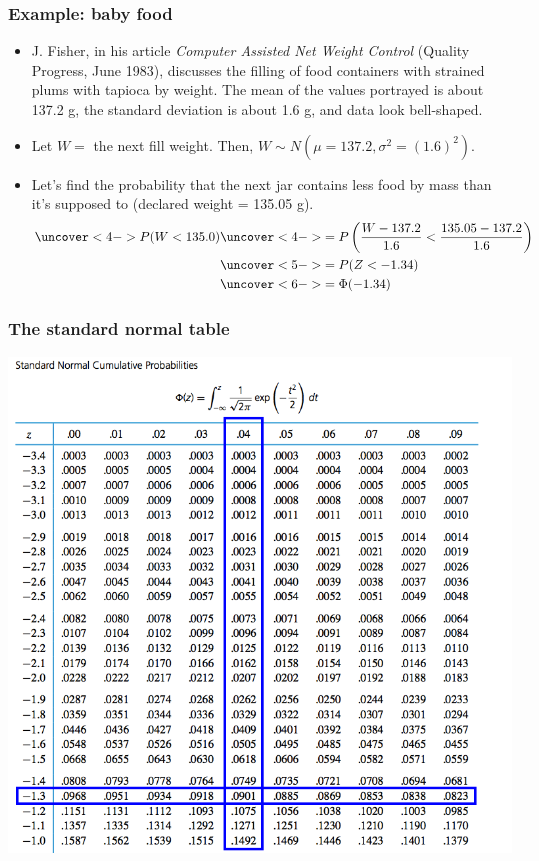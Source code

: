 \documentclass[handout]{beamer}\usepackage[]{graphicx}\usepackage[]{color}
\numberwithin{equation}{section}
\begin{document}
\begin{frame}
\frametitle{Example: baby food} \small
\begin{itemize}
 \item J. Fisher, in his article \emph{Computer Assisted Net Weight Control} (Quality Progress, June 1983), discusses the filling of food containers with strained plums with tapioca by weight. The mean of the values portrayed is about 137.2 g, the standard deviation is about 1.6 g, and data look bell-shaped.
\pause \item Let $W = $ the next fill weight. Then, $W \sim N(\mu = 137.2, \sigma^2 = (1.6)^2)$.
\pause \item Let's find the probability that the next jar contains less food by mass than it's supposed to (declared weight = 135.05 g).
\begin{align*}
\uncover<4->{ P(W < 135.0) }& \uncover<4->{ = P\left (\frac{W - 137.2}{1.6} < \frac{135.05 - 137.2}{1.6} \right )} \\
&\uncover<5->{ = P ( Z < -1.34 )} \\
&\uncover<6->{ = \Phi(-1.34)}
\end{align*}
\end{itemize}
\end{frame}

\begin{frame}
\frametitle{The standard normal table}
 \includegraphics{../../fig/sn1.png}
\end{frame}
\end{document}
